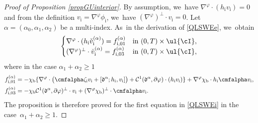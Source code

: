\begin{proof}[Proof of Proposition \ref{propGUinterior}]
By assumption, we~have $\nabla^{\varphi}\cdot(h_\mathrm{i}v_\mathrm{i})=0$ and from the definition $v_\mathrm{i}=\nabla^\varphi \phi_\mathrm{i}$, we~have $(\nabla^\varphi)^\perp\cdot v_\mathrm{i}=0$.
Let $\alpha=(\alpha_0,\alpha_1,\alpha_2)$ be a multi-index. As~in the derivation of \eqref{QLSWEe}, we~obtain
\begin{equation}\label{preQLSWEi0}
\begin{cases}
\nabla^\varphi\cdot(h_\mathrm{i}\check{v}_\mathrm{i}^{(\alpha)}) = f_{{\rm i},01}^{(\alpha)} &\text{in } (0,T)\times\ul{\cI}, \\
(\nabla^\varphi)^\perp\cdot\check{v}_\mathrm{i}^{(\alpha)} = f_{{\rm i},03}^{(\alpha)} &\text{in } (0,T)\times\ul{\cI},
\end{cases}
\end{equation}
where in the case $\alpha_1+\alpha_2\geq1$
\begin{align}
\label{deffi01}
f_{{\rm i},01}^{(\alpha)}
&= -\chi_\mathrm{b}\{ \nabla^\varphi\cdot\bigl(\cmfalpha\zeta_\mathrm{i} v_\mathrm{i}
+ [\mathfrak{d}^\alpha;h_\mathrm{i},v_\mathrm{i}] \bigr)
+ {\mathcal C}^1(\mathfrak{d}^\alpha,\partial\varphi)\cdot(h_\mathrm{i}v_\mathrm{i}) \}
+ \nabla^\varphi\chi_\mathrm{b}\cdot h_\mathrm{i} \cmfalpha v_\mathrm{i} , \\
\label{deffi03}
f_{{\rm i},03}^{(\alpha)}
&= -\chi_\mathrm{b} {\mathcal C}^1(\mathfrak{d}^\alpha,\partial\varphi)^\perp\cdot v_\mathrm{i}
+ (\nabla^\varphi\chi_\mathrm{b})^\perp\cdot \cmfalpha v_\mathrm{i}.
\end{align}
The proposition is therefore proved for the first equation in \eqref{QLSWEi} in the case~\hbox{$\alpha_1\!+\!\alpha_2\!\geq\! 1$}.


\end{proof}

